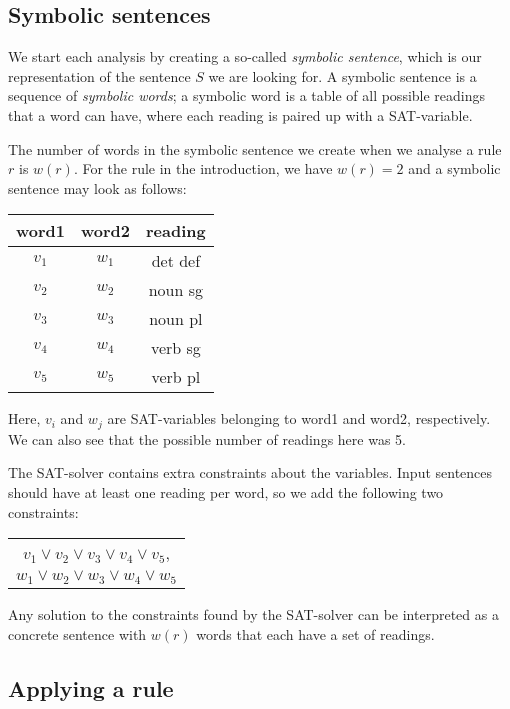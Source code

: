 \subsection{Symbolic sentences}

We start each analysis by creating a so-called {\em symbolic sentence}, which is our representation of the sentence $S$ we are looking for. A symbolic sentence is a sequence of {\em symbolic words}; a symbolic word is a table of all possible readings that a word can have, where each reading is paired up with a SAT-variable.

The number of words in the symbolic sentence we create when we analyse a rule $r$ is $w(r)$. For the rule in the introduction, we have $w(r)=2$ and a symbolic sentence may look as follows:
\begin{center}
\begin{tabular}{c|c|c}
word1 & word2 & reading \\
\hline
$v_1$ & $w_1$ & det def \\
$v_2$ & $w_2$ & noun sg \\
$v_3$ & $w_3$ & noun pl \\
$v_4$ & $w_4$ & verb sg \\
$v_5$ & $w_5$ & verb pl \\
\end{tabular}
\end{center}
Here, $v_i$ and $w_j$ are SAT-variables belonging to word1 and word2, respectively. We can also see that the possible number of readings here was 5.

The SAT-solver contains extra constraints about the variables. Input sentences should have at least one reading per word, so we add the following two constraints:
\begin{center}
\begin{tabular}{c}
$v_1 \vee v_2 \vee v_3 \vee v_4 \vee v_5$, \\
$w_1 \vee w_2 \vee w_3 \vee w_4 \vee w_5$ \\
\end{tabular}
\end{center}
Any solution to the constraints found by the SAT-solver can be interpreted as a concrete sentence with $w(r)$ words that each have a set of readings.

\subsection{Applying a rule}

